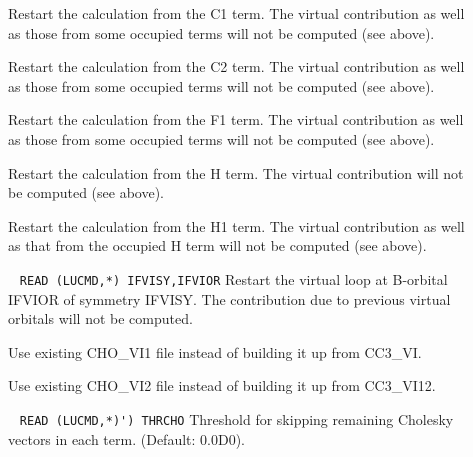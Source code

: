 \begin{description}
%
\item[] 
        Restart the calculation from the C1 term. The virtual contribution
        as well as those from some occupied terms will
        not be computed (see above).
%
\item[] 
        Restart the calculation from the C2 term. The virtual contribution
        as well as those from some occupied terms will
        not be computed (see above).
%
\item[] 
        Restart the calculation from the F1 term. The virtual contribution
        as well as those from some occupied terms will
        not be computed (see above).
%
\item[] 
        Restart the calculation from the H term. The virtual contribution
        will not be computed (see above).
%
\item[] 
        Restart the calculation from the H1 term. The virtual contribution
        as well as that from the occupied H term will
        not be computed (see above).
%
\item[]\verb| |\newline
\verb|READ (LUCMD,*) IFVISY,IFVIOR|\newline 
        Restart the virtual loop at B-orbital IFVIOR of symmetry IFVISY.
        The contribution due to previous virtual orbitals will 
        not be computed.

%
\item[] 
        Use existing CHO\_VI1 file instead of building it up 
        from CC3\_VI.
%
\item[] 
        Use existing CHO\_VI2 file instead of building it up 
        from CC3\_VI12.
%
        
%
\item[] \verb| |\newline
\verb|READ (LUCMD,*)') THRCHO|\newline
        Threshold for skipping remaining Cholesky vectors in 
        each term. (Default: 0.0D0).
%
\end{description}

